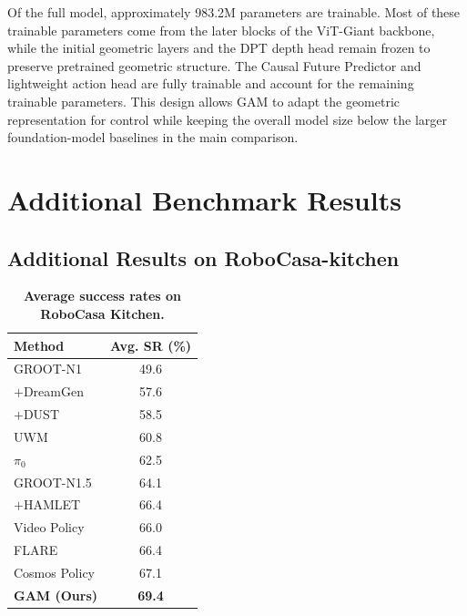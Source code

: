 \documentclass{llmxive}
\providecommand{\arraystretch}{0.98}
\providecommand{\tabitem}{\hspace{0.3em}$+$\hspace{0.25em}}
\begin{document}
Of the full model, approximately 983.2M parameters are trainable. Most of these trainable parameters come from the later blocks of the ViT-Giant backbone, while the initial geometric layers and the DPT depth head remain frozen to preserve pretrained geometric structure. The Causal Future Predictor and lightweight action head are fully trainable and account for the remaining trainable parameters. This design allows GAM to adapt the geometric representation for control while keeping the overall model size below the larger foundation-model baselines in the main comparison.


\section{Additional Benchmark Results}
\label{sec:appendix-additional_results}
\subsection{Additional Results on RoboCasa-kitchen}
\label{sec:appendix-robocasa}
\renewcommand{\tabitem}{\hspace{0.3em}$+$\hspace{0.25em}}

\begin{table}[t]

\vspace{-10pt}
\centering
\footnotesize
\setlength{\tabcolsep}{5.0pt}
\renewcommand{\arraystretch}{1.06}
\begin{tabular}{@{}lc@{}}
\toprule
Method & Avg. SR (\%) \\
\midrule
GROOT-N1              & 49.6 \\
\tabitem DreamGen     & 57.6 \\
\tabitem DUST         & 58.5 \\
\addlinespace[0.25em]
UWM                   & 60.8 \\
$\pi_0$               & 62.5 \\
\addlinespace[0.25em]
GROOT-N1.5            & 64.1 \\
\tabitem HAMLET       & 66.4 \\
\addlinespace[0.25em]
Video Policy          & 66.0 \\
FLARE                 & 66.4 \\
Cosmos Policy         & 67.1 \\
\textbf{GAM (Ours)}  & \textbf{69.4} \\

\bottomrule
\end{tabular}

\vspace{-0.8em}

\caption{\textbf{Average success rates on RoboCasa Kitchen.}}
\label{tab:training-demos-average-sr}
\end{table}
\end{document}
